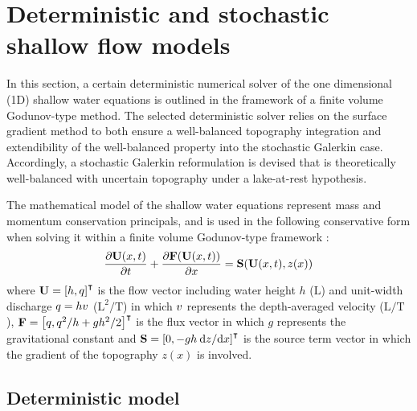 \clearpage
\section{Deterministic and stochastic shallow flow models}

In this section, a certain deterministic numerical solver of the one dimensional (1D) shallow water equations is outlined in the framework of a finite volume Godunov-type method.
The selected deterministic solver relies on the surface gradient method \citep{zhou2001} to both ensure a well-balanced topography integration and extendibility of the well-balanced property into the stochastic Galerkin case. 
Accordingly, a stochastic Galerkin reformulation is devised that is theoretically well-balanced with uncertain topography under a lake-at-rest hypothesis.

The mathematical model of the shallow water equations represent mass and momentum
conservation principals, and is used in the following conservative form when solving it within a finite volume Godunov-type framework \citep{toro-garcianavarro2007}:
\begin{align}
\frac{\partial \mathbf{U}(x, t)}{\partial t} + \frac{\partial \mathbf{F}(\mathbf{U}(x, t))}{\partial x} = \mathbf{S}(\mathbf{U}(x, t), z(x)) \label{eqn:swe}
\end{align}
where $\mathbf{U} = \left[ h, q \right]^\intercal$ is the flow vector including water height $h$ ($\mathrm{L}$) and unit-width discharge $q = hv$ ($\mathrm{L}^2/\mathrm{T}$) in which $v$ represents the depth-averaged velocity ($\mathrm{L}/\mathrm{T}$), $\mathbf{F} = \left[ q,  q^2/h + gh^2/2 \right]^\intercal$ is the flux vector in which $g$ represents the gravitational constant and $\mathbf{S} = \left[ 0, -gh \: \mathrm{d} z / \mathrm{d} x \right]^\intercal$ is the source term vector in which the gradient of the topography $z(x)$ is involved.

\subsection{Deterministic model}

